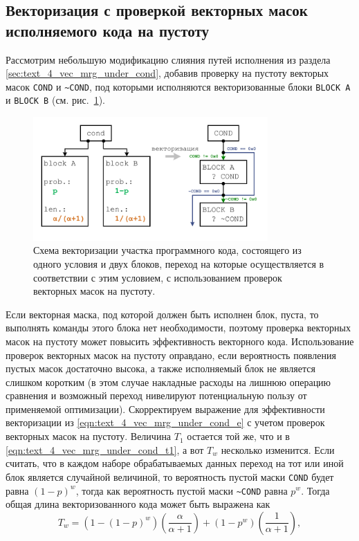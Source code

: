 \subsection{Векторизация с проверкой векторных масок исполняемого кода на пустоту}\label{sec:text_4_vec_check_mask}

Рассмотрим небольшую модификацию слияния путей исполнения из раздела \ref{sec:text_4_vec_mrg_under_cond}, добавив проверку на пустоту векторых масок \texttt{COND} и \texttt{\textasciitilde COND}, под которыми исполняются векторизованные блоки \texttt{BLOCK A} и \texttt{BLOCK B} \cite{Rybakov2024VecComb} (см. рис.~\ref{fig:text_4_vec_check_mask_cond}). 

\begin{figure}[ht]
	\centering
	\includegraphics[width=0.8\textwidth]{./pics/text_4_vec_check_mask/cond.pdf}
	\caption{Схема векторизации участка программного кода, состоящего из одного условия и двух блоков, переход на которые осуществляется в соответствии с этим условием, с использованием проверок векторных масок на пустоту.}
	\label{fig:text_4_vec_check_mask_cond}
\end{figure}

Если векторная маска, под которой должен быть исполнен блок, пуста, то выполнять команды этого блока нет необходимости, поэтому проверка векторных масок на пустоту может повысить эффективность векторного кода.
Использование проверок векторных масок на пустоту оправдано, если вероятность появления пустых масок достаточно высока, а также исполняемый блок не является слишком коротким (в этом случае накладные расходы на лишнюю операцию сравнения и возможный переход нивелируют потенциальную пользу от применяемой оптимизации).
Скорректируем выражение для эффективности векторизации из \eqref{eqn:text_4_vec_mrg_under_cond_e} с учетом проверок векторных масок на пустоту.
Величина $T_1$ остается той же, что и в \eqref{eqn:text_4_vec_mrg_under_cond_t1}, а вот $T_w$ несколько изменится.
Если считать, что в каждом наборе обрабатываемых данных переход на тот или иной блок является случайной величиной, то вероятность пустой маски \texttt{COND} будет равна $(1 - p)^w$, тогда как вероятность пустой маски \texttt{\textasciitilde COND} равна $p^w$.
Тогда общая длина векторизованного кода может быть выражена как
\begin{equation}\label{eqn:text_4_vec_check_mask_tw}
	T_w = \left(1 - (1 - p)^w\right)\left(\frac{\alpha}{\alpha + 1}\right) + (1 - p^w)\left(\frac{1}{\alpha + 1}\right),
\end{equation}

